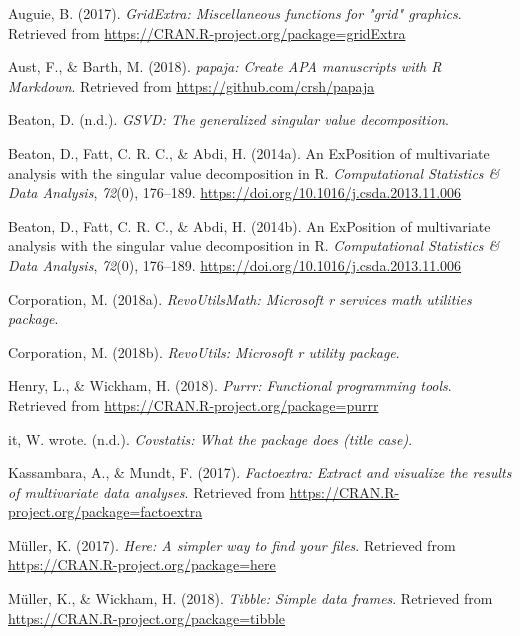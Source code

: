 \documentclass[man,floatsintext]{apa6}
\theoremstyle{definition}
\theoremstyle{definition}
\theoremstyle{definition}
\theoremstyle{remark}
\begin{document}
\leavevmode\hypertarget{ref-R-gridExtra}{}%
Auguie, B. (2017). \emph{GridExtra: Miscellaneous functions for "grid"
graphics}. Retrieved from
\url{https://CRAN.R-project.org/package=gridExtra}

\leavevmode\hypertarget{ref-R-papaja}{}%
Aust, F., \& Barth, M. (2018). \emph{papaja: Create APA manuscripts with
R Markdown}. Retrieved from \url{https://github.com/crsh/papaja}

\leavevmode\hypertarget{ref-R-GSVD}{}%
Beaton, D. (n.d.). \emph{GSVD: The generalized singular value
decomposition}.

\leavevmode\hypertarget{ref-R-ExPosition}{}%
Beaton, D., Fatt, C. R. C., \& Abdi, H. (2014a). An ExPosition of
multivariate analysis with the singular value decomposition in R.
\emph{Computational Statistics \& Data Analysis}, \emph{72}(0),
176--189. \url{https://doi.org/10.1016/j.csda.2013.11.006}

\leavevmode\hypertarget{ref-R-prettyGraphs}{}%
Beaton, D., Fatt, C. R. C., \& Abdi, H. (2014b). An ExPosition of
multivariate analysis with the singular value decomposition in R.
\emph{Computational Statistics \& Data Analysis}, \emph{72}(0),
176--189. \url{https://doi.org/10.1016/j.csda.2013.11.006}

\leavevmode\hypertarget{ref-R-RevoUtilsMath}{}%
Corporation, M. (2018a). \emph{RevoUtilsMath: Microsoft r services math
utilities package}.

\leavevmode\hypertarget{ref-R-RevoUtils}{}%
Corporation, M. (2018b). \emph{RevoUtils: Microsoft r utility package}.

\leavevmode\hypertarget{ref-R-purrr}{}%
Henry, L., \& Wickham, H. (2018). \emph{Purrr: Functional programming
tools}. Retrieved from \url{https://CRAN.R-project.org/package=purrr}

\leavevmode\hypertarget{ref-R-covstatis}{}%
it, W. wrote. (n.d.). \emph{Covstatis: What the package does (title
case)}.

\leavevmode\hypertarget{ref-R-factoextra}{}%
Kassambara, A., \& Mundt, F. (2017). \emph{Factoextra: Extract and
visualize the results of multivariate data analyses}. Retrieved from
\url{https://CRAN.R-project.org/package=factoextra}

\leavevmode\hypertarget{ref-R-here}{}%
Müller, K. (2017). \emph{Here: A simpler way to find your files}.
Retrieved from \url{https://CRAN.R-project.org/package=here}

\leavevmode\hypertarget{ref-R-tibble}{}%
Müller, K., \& Wickham, H. (2018). \emph{Tibble: Simple data frames}.
Retrieved from \url{https://CRAN.R-project.org/package=tibble}
\end{document}
